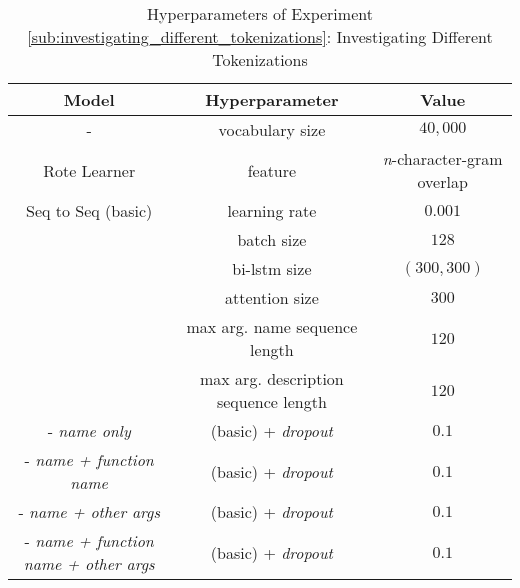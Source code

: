\begin{table}[h!]
\begin{center}
\begin{tabular}{ c | c | c  }
    \textbf{Model}                           {}  & \textbf{Hyperparameter}  & \textbf{Value}    \\
    \hline
    -                                 & vocabulary size            & $40,000$ \\
    \hline
    Rote Learner                      & feature                    & \textit{n}-character-gram overlap \\
    \hline
    Seq to Seq  (basic)               & learning rate              & $0.001$         \\
                                      & batch size                 & $128$           \\
                                      & bi-lstm size               & $(300,300) $    \\
                                      & attention size             & $300$           \\
                                      & max arg. name sequence length         & $120$   \\
                                      & max arg. description sequence length  & $120$  \\
    \hdashline
    - \textit{name only}              & (basic) + \textit{dropout}           & $0.1$           \\
    - \textit{name + function name}   & (basic) + \textit{dropout}           & $0.1$           \\
    - \textit{name + other args}      & (basic) + \textit{dropout}           & $0.1$           \\
    - \textit{name + function name + other args} & (basic) + \textit{dropout}   & $0.1$        \\
\end{tabular}
\caption {Hyperparameters of Experiment \ref{sub:investigating_different_tokenizations}: Investigating Different Tokenizations }
\label{table:hyperparams_different_tokenizations}
\end{center}
\end{table}


